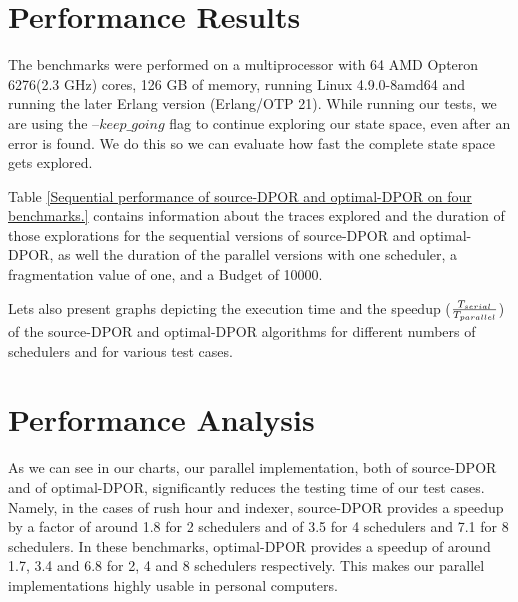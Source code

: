 \section{Performance Results}

The benchmarks were performed on a multiprocessor with 64 AMD Opteron 6276(2.3 GHz) cores, 126 GB of memory, running
Linux 4.9.0-8amd64 and running the later Erlang version (Erlang/OTP 21). While running our tests, we are using the
--$keep\_going$ flag to continue exploring our state space, even after an error is found. We do this so we can evaluate
how fast the complete state space gets explored.

Table \ref{Sequential performance of source-DPOR and optimal-DPOR on four benchmarks.} contains information about the traces explored and the duration of those
explorations for the sequential versions of source-DPOR and optimal-DPOR, as well the duration of the parallel versions with one scheduler, a fragmentation value of one, and a Budget of 10000.


Lets also present graphs depicting the execution time and the speedup ($T_{serial} 
\over T_{parallel}$) of the source-DPOR and optimal-DPOR algorithms
for different numbers of schedulers and for various test cases.



\section{Performance Analysis}

As we can see in our charts, our parallel implementation, both of source-DPOR and of optimal-DPOR, significantly reduces the testing
time of our test cases. Namely, in the cases of rush hour and indexer, source-DPOR provides a speedup by a factor of around 1.8 for 2 schedulers and
of 3.5 for 4 schedulers and 7.1 for 8 schedulers. In these benchmarks, optimal-DPOR provides a speedup of around 1.7, 3.4 and 6.8 for 2, 4 and 8 schedulers respectively. This makes our parallel implementations highly usable in personal computers.

